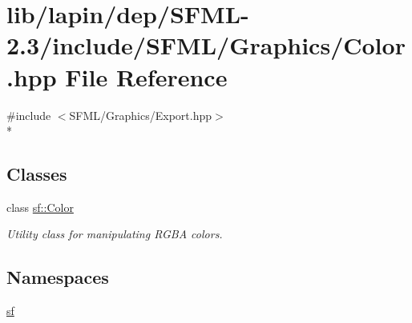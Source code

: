 \hypertarget{lib_2lapin_2dep_2_s_f_m_l-2_83_2include_2_s_f_m_l_2_graphics_2_color_8hpp}{\section{lib/lapin/dep/\-S\-F\-M\-L-\/2.3/include/\-S\-F\-M\-L/\-Graphics/\-Color.hpp File Reference}
\label{lib_2lapin_2dep_2_s_f_m_l-2_83_2include_2_s_f_m_l_2_graphics_2_color_8hpp}
}
{\ttfamily \#include $<$S\-F\-M\-L/\-Graphics/\-Export.\-hpp$>$}\\*
\subsection*{Classes}
\begin{DoxyCompactItemize}
\item 
class \hyperlink{classsf_1_1_color}{sf\-::\-Color}
\begin{DoxyCompactList}\small\item\em Utility class for manipulating R\-G\-B\-A colors. \end{DoxyCompactList}\end{DoxyCompactItemize}
\subsection*{Namespaces}
\begin{DoxyCompactItemize}
\item 
\hyperlink{namespacesf}{sf}
\end{DoxyCompactItemize}

